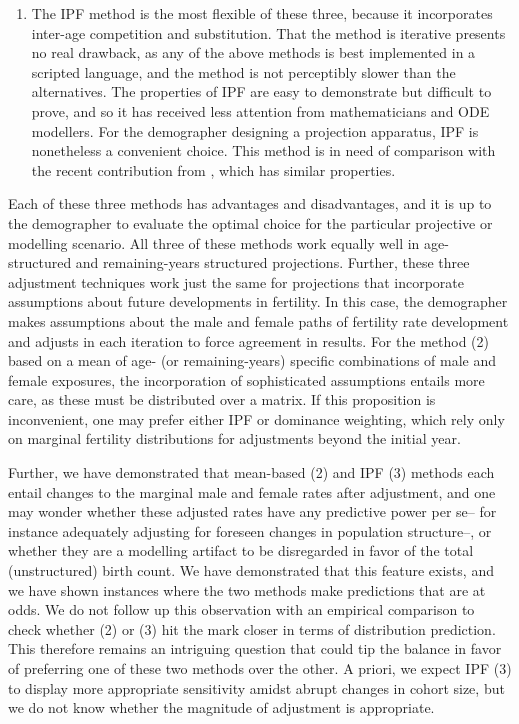 \begin{enumerate}
\item The IPF method is the most flexible of these three, because it
incorporates inter-age competition and substitution. That the method is
iterative presents no real drawback, as any of the above methods is best 
implemented in a scripted language, and the method is
not perceptibly slower than the alternatives. The properties of IPF are easy to
demonstrate but difficult to prove, and so it has received less attention from
mathematicians and ODE modellers. For the demographer designing a projection
apparatus, IPF is nonetheless a convenient choice. This method is in need of
comparison with the recent contribution from \citet{choo2006estimating}, which
has similar properties.
\end{enumerate}

Each of these three methods has advantages and disadvantages, and it is up to
the demographer to evaluate the optimal choice for the particular projective or
modelling scenario. All three of these methods work equally well in
age-structured and remaining-years structured projections. Further, these three
adjustment techniques work just the same for projections that incorporate
assumptions about future developments in fertility. In this case, the
demographer makes assumptions about the male and female paths of fertility rate development and adjusts in each
iteration to force agreement in results. For the method (2) based on a mean of
age- (or remaining-years) specific combinations of male and female exposures,
the incorporation of sophisticated assumptions entails more care, as these must be
distributed over a matrix. If this proposition is inconvenient, one may prefer
either IPF or dominance weighting, which rely only on marginal fertility
distributions for adjustments beyond the initial year.

Further, we have demonstrated that mean-based (2) and IPF (3) methods each
entail changes to the marginal male and female rates after adjustment, and one
may wonder whether these adjusted rates have any predictive power per se-- for
instance adequately adjusting for foreseen changes in population structure--, or
whether they are a modelling artifact to be disregarded in favor of the total 
(unstructured) birth count. We have demonstrated that this feature exists,
and we have shown instances where the two methods make predictions that are at
odds. We do not follow up this observation with an empirical comparison
to check whether (2) or (3) hit the mark closer in terms of distribution
prediction. This therefore remains an intriguing question that could tip the
balance in favor of preferring one of these two methods over the other. A
priori, we expect IPF (3) to display more appropriate sensitivity amidst abrupt
changes in cohort size, but we do not know whether the magnitude of adjustment is
appropriate. 

